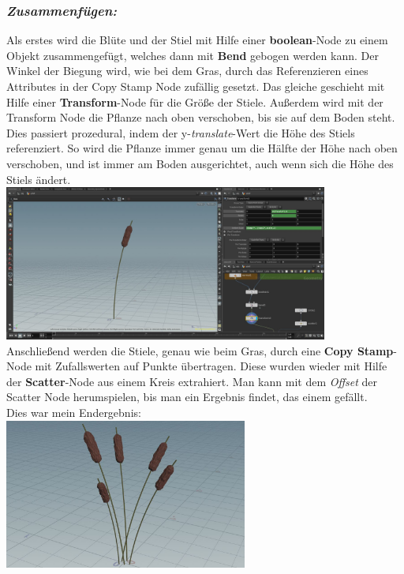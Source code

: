 \documentclass[paper=a4,fontsize=12pt,ngerman]{scrartcl}
\begin{document}
	\subsubsection*{\textit{Zusammenfügen:}}
	Als erstes wird die Blüte und der Stiel mit Hilfe einer \textbf{boolean}-Node zu einem Objekt zusammengefügt, welches dann mit \textbf{Bend} gebogen werden kann. Der Winkel der Biegung wird, wie bei dem Gras, durch das Referenzieren eines Attributes in der Copy Stamp Node zufällig gesetzt. Das gleiche geschieht mit Hilfe einer \textbf{Transform}-Node für die Größe der Stiele. Außerdem wird mit der Transform Node die Pflanze nach oben verschoben, bis sie auf dem Boden steht. Dies passiert prozedural, indem der y-\textit{translate}-Wert die Höhe des Stiels referenziert. So wird die Pflanze immer genau um die Hälfte der Höhe nach oben verschoben, und ist immer am Boden ausgerichtet, auch wenn sich die Höhe des Stiels ändert. \\
	\includegraphics*[width=0.8\textwidth]{graphics/stiel.jpg}\\
	Anschließend werden die Stiele, genau wie beim Gras, durch eine \textbf{Copy Stamp}-Node mit Zufallswerten auf Punkte übertragen. Diese wurden wieder mit Hilfe der \textbf{Scatter}-Node aus einem Kreis extrahiert. Man kann mit dem \textit{Offset} der Scatter Node herumspielen, bis man ein Ergebnis findet, das einem gefällt.\\
	Dies war mein Endergebnis: \\
	\includegraphics*[width=0.6\textwidth]{graphics/schilf.jpg}\\
	
\end{document}
